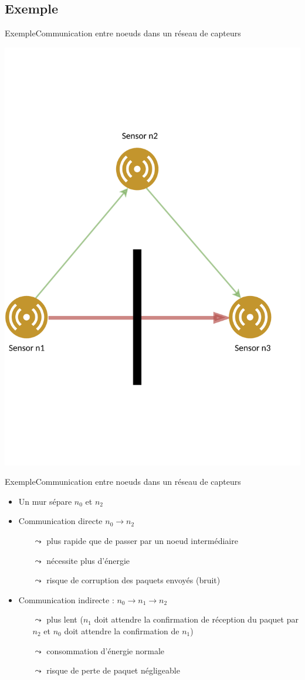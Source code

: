 \documentclass[compress]{beamer}
\begin{document}
\subsection{Exemple}
\begin{frame}{Exemple}{Communication entre noeuds dans un réseau de capteurs}
  \begin{center}
    \includegraphics[width=0.65\linewidth]{resources/main-example.pdf}
  \end{center}
\end{frame}

\begin{frame}{Exemple}{Communication entre noeuds dans un réseau de capteurs}
      \begin{itemize}
        \item Un mur sépare $n_0$ et $n_2$
        \item Communication directe $n_0 \rightarrow n_2$
        \begin{itemize}
          \item[$\leadsto$] plus rapide que de passer par un noeud intermédiaire
          \item[$\leadsto$] nécessite plus d'énergie
          \item[$\leadsto$] risque de corruption des paquets envoyés (bruit)
        \end{itemize}
        \item Communication indirecte : $n_0 \rightarrow n_1 \rightarrow n_2$
        \begin{itemize}
          \item[$\leadsto$] plus lent ($n_1$ doit attendre la confirmation de réception du paquet par $n_2$ et $n_0$ doit attendre la confirmation de $n_1$)
          \item[$\leadsto$] consommation d'énergie normale
          \item[$\leadsto$] risque de perte de paquet négligeable
        \end{itemize}
      \end{itemize}
\end{frame}
\end{document}
